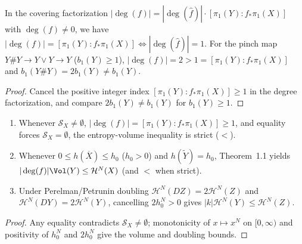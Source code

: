 \begin{lemma}
\label{lem_remark_index_necessity}
\leanok
{}
In the covering factorization $|\deg(f)| = |\deg(\hat{f})| \cdot [\pi_1(Y) : f_*\pi_1(X)]$ with
$\deg(f) \neq 0$, we have $|\deg(f)| = [\pi_1(Y) : f_*\pi_1(X)] \iff |\deg(\hat{f})| = 1$.
For the pinch map $Y \# Y \to Y \vee Y \to Y$ ($b_1(Y) \ge 1$), $|\deg(f)| = 2 > 1 = [\pi_1(Y):f_*\pi_1(X)]$
and $b_1(Y \# Y) = 2 b_1(Y) \neq b_1(Y)$.
\end{lemma}
\begin{proof}\leanok
Cancel the positive integer index $[\pi_1(Y) : f_*\pi_1(X)] \ge 1$ in the degree factorization, and
compare $2 b_1(Y) \neq b_1(Y)$ for $b_1(Y) \ge 1$.
\end{proof}

\begin{lemma}
\label{lem_strictness_and_doubling}
\leanok
{}
\begin{enumerate}
\item Whenever $\mathcal{S}_X \neq \emptyset$, $|\deg(f)| = [\pi_1(Y):f_*\pi_1(X)] \ge 1$, and
equality forces $\mathcal{S}_X = \emptyset$, the entropy-volume inequality is strict ($<$).
\item Whenever $0 \le h(\overline{X}) \le h_0$ ($h_0 > 0$) and $h(\widetilde{Y}) = h_0$, Theorem~1.1
yields $|\deg(f)|\Vol(Y) \le \mathcal{H}^N(X)$ (and $<$ when strict).
\item Under Perelman/Petrunin doubling $\mathcal{H}^N(DZ) = 2\mathcal{H}^N(Z)$ and
$\mathcal{H}^N(DY) = 2\mathcal{H}^N(Y)$, cancelling $2 h_0^N > 0$ gives $|k|\mathcal{H}^N(Y) \le \mathcal{H}^N(Z)$.
\end{enumerate}
\end{lemma}
\begin{proof}\leanok
Any equality contradicts $\mathcal{S}_X \neq \emptyset$; monotonicity of $x \mapsto x^N$ on
$[0,\infty)$ and positivity of $h_0^N$ and $2 h_0^N$ give the volume and doubling bounds.
\end{proof}

